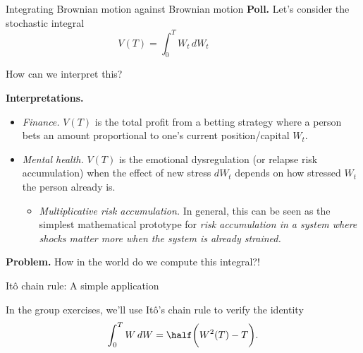 \documentclass[10pt]{beamer}
\begin{document}
\begin{frame}{Integrating Brownian motion against Brownian motion}
\small 
\colorbox{yellow!30}{\textbf{Poll.}}  Let's consider the stochastic integral
\[V(T) = \int_0^T W_t \, dW_t \qquad \qquad \]

How can we interpret this? 
\pause 

\colorbox{green!30}{\textbf{Interpretations.}}
\begin{itemize}
	\item \textit{Finance.} $V(T)$ is the total profit from a betting strategy where a person bets an amount proportional to one's current position/capital $W_t$. \pause 
	\item \textit{Mental health.}  $V(T)$ is the emotional dysregulation (or relapse risk accumulation) when the effect of new stress $dW_t$ depends on how stressed $W_t$ the person already is. \pause 
	\begin{itemize}
	\item \textit{Multiplicative risk accumulation.} In general, this can be seen as the simplest mathematical prototype for \textit{risk accumulation in a system where shocks matter more when the system is already strained.} \pause 
	\end{itemize}  
\end{itemize}

\pause 

\colorbox{red!30}{\textbf{Problem.}} How in the world do we \alert{compute} this integral?!

\end{frame}

\begin{frame}{It\^{o} chain rule: A simple application} 

In the group exercises, we'll use It\^{o}'s chain rule to verify the identity
\[ \int_0^T W \, dW = \half \bigg( W^2(T) - T \bigg). \]


\begin{itemize}
\end{itemize}
\end{frame}
\end{document}
